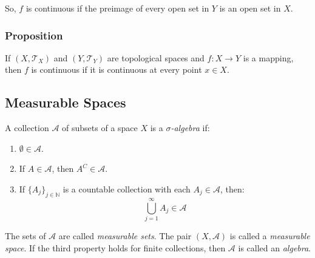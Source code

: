 \documentclass[11pt]{article}
\begin{document}
\begin{center}
\end{center}

So, $f$ is continuous if the preimage of every open set in $Y$ is an open set in $X$.

\subsubsection{Proposition}
If $(X, \mathcal{T}_X)$ and $(Y, \mathcal{T}_Y)$ are topological spaces and $f: X \to Y$ is a mapping, then $f$ is continuous if it is continuous at every point $x \in X$.

\subsection{Measurable Spaces}
A collection $\mathcal{A}$ of subsets of a space $X$ is a \textit{$\sigma$-algebra} if:
\begin{enumerate}
    \item $\emptyset \in \mathcal{A}$.
    \item If $A \in \mathcal{A}$, then $A^C\in \mathcal{A}$.
    \item If $\{A_j\}_{j \in \mathbb{N}}$ is a countable collection with each $A_j \in \mathcal{A}$, then:
    \[\bigcup_{j=1}^{\infty} A_j \in \mathcal{A}\]
\end{enumerate}

The sets of $\mathcal{A}$ are called \textit{measurable sets}. The pair $(X, \mathcal{A})$ is called a \textit{measurable space}. If the third property holds for finite collections, then $\mathcal{A}$ is called an \textit{algebra}.
\end{document}
